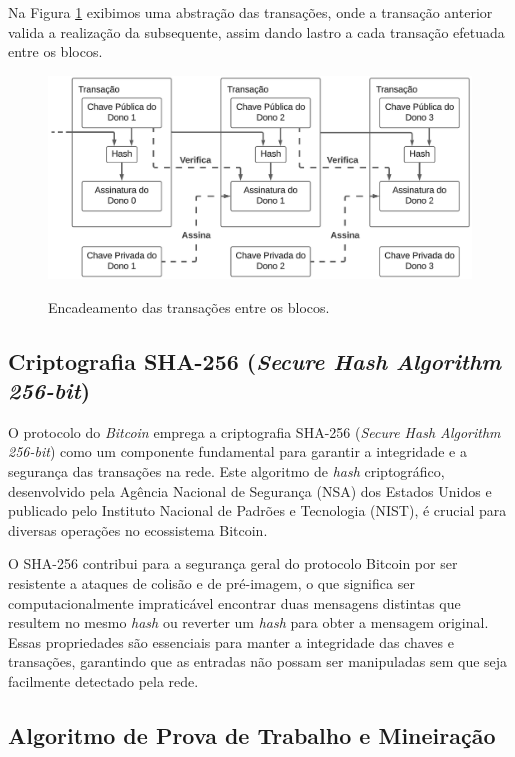 \documentclass[article,12pt,oneside,a4paper,english,brazil]{unifil}
\begin{document}
\begin{Spacing}{1.5}
Na Figura \ref*{fig:transactions} exibimos uma abstração das transações, onde a transação anterior valida a realização da subsequente, assim dando lastro a cada transação efetuada entre os blocos.

\begin{figure}[h]
	\centering
	\caption{Encadeamento das transações entre os blocos.}
	\includegraphics[width=.8\linewidth]{../images/figura 1.png}
	\label{fig:transactions}

\end{figure}

\subsection*{Criptografia SHA-256 (\textit{Secure Hash Algorithm 256-bit})} \label{subsec:sha256}

O protocolo do \textit{Bitcoin} emprega a criptografia SHA-256 (\textit{Secure Hash Algorithm 256-bit}) como um componente fundamental para garantir a integridade e a segurança das transações na rede. Este algoritmo de \textit{hash} criptográfico, desenvolvido pela Agência Nacional de Segurança (NSA) dos Estados Unidos e publicado pelo Instituto Nacional de Padrões e Tecnologia (NIST), é crucial para diversas operações no ecossistema Bitcoin.

O SHA-256 contribui para a segurança geral do protocolo Bitcoin por ser resistente a ataques de colisão e de pré-imagem, o que significa ser computacionalmente impraticável encontrar duas mensagens distintas que resultem no mesmo \textit{hash} ou reverter um \textit{hash} para obter a mensagem original. Essas propriedades são essenciais para manter a integridade das chaves e transações, garantindo que as entradas não possam ser manipuladas sem que seja facilmente detectado pela rede.

\subsection*{Algoritmo de Prova de Trabalho e Mineiração} \label{subsec:pow}


\end{Spacing}
\end{document}
